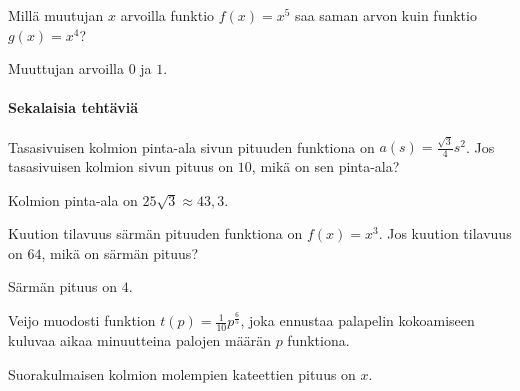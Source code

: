 \begin{tehtavasivu}
\begin{tehtava}
Millä muutujan $x$ arvoilla funktio $ f(x)=x^{5}$ saa saman arvon kuin funktio $ g(x)=x^{4}$?
\begin{vastaus}
Muuttujan arvoilla $0$ ja $1$.
\end{vastaus}
\end{tehtava}

\paragraph*{Sekalaisia tehtäviä}

\begin{tehtava}
Tasasivuisen kolmion pinta-ala sivun pituuden funktiona on $a(s) = \frac{\sqrt{3}}{4}s^{2}$. Jos tasasivuisen kolmion sivun pituus on $10$, mikä on sen pinta-ala?
\begin{vastaus}
Kolmion pinta-ala on $25\sqrt{3}\approx43,3$.
\end{vastaus}
\end{tehtava}

\begin{tehtava}
Kuution tilavuus särmän pituuden funktiona on $f(x) = x^3$. Jos kuution tilavuus on $64$, mikä on särmän pituus?
\begin{vastaus}
Särmän pituus on $4$.
\end{vastaus}
\end{tehtava}

\begin{tehtava}
Veijo muodosti funktion $t(p)=\frac{1}{10}p^{\frac{6}{5}}$, joka ennustaa palapelin kokoamiseen kuluvaa aikaa minuutteina palojen määrän $ p $ funktiona. 
\begin{alakohdat}
\end{alakohdat}
\begin{vastaus}
\begin{alakohdat}
\end{alakohdat}
\end{vastaus}
\end{tehtava}

\begin{tehtava}
Suorakulmaisen kolmion molempien kateettien pituus on $x$.
\begin{alakohdat}
\end{alakohdat}
\begin{vastaus}
\begin{alakohdat}
\end{alakohdat}
\end{vastaus}
\end{tehtava}


\end{tehtavasivu}
